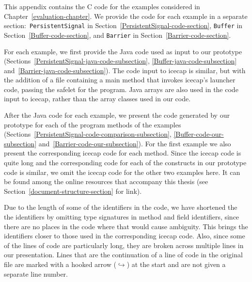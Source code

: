 \renewcommand\#{\char"0023}


This appendix contains the C code for the examples considered in
Chapter~\ref{evaluation-chapter}.
We provide the code for each example in a separate
section:~\texttt{PersistentSignal} in
Section~\ref{PersistentSignal-code-section}, \texttt{Buffer} in
Section~\ref{Buffer-code-section}, and \texttt{Barrier} in
Section~\ref{Barrier-code-section}.

For each example, we first provide the Java code used as input to our
prototype (Sections~\ref{PersistentSignal-java-code-subsection},
\ref{Buffer-java-code-subsection}
and~\ref{Barrier-java-code-subsection}).
The code input to icecap is similar, but with the addition of a file
containing a main method that invokes icecap's launcher code, passing
the safelet for the program.
Java arrays are also used in the code input to icecap, rather than the
array classes used in our code.

After the Java code for each example, we present the code generated by
our prototype for each of the program methods of the examples
(Sections~\ref{PersistentSignal-code-comparison-subsection},
\ref{Buffer-code-our-subsection}
and~\ref{Barrier-code-our-subsection}).
For the first example we also present the corresponding icecap code
for each method.
Since the icecap code is quite long and the corresponding code for
each of the constructs in our prototype code is similar, we omit the
icecap code for the other two examples here.
It can be found among the online resources that accompany this thesis
(see Section~\ref{document-structure-section} for link).

Due to the length of some of the identifiers in the code, we have
shortened the the identifiers by omitting type signatures in method
and field identifiers, since there are no places in the code where
that would cause ambiguity.
This brings the identifiers closer to those used in the corresponding
icecap code.
Also, since some of the lines of code are particularly long, 
they are broken across multiple lines in our presentation.
Lines that are the continuation of a line of code in the original file
are marked with a hooked arrow (\mbox{$\hookrightarrow$}) at the start
and are not given a separate line number.


